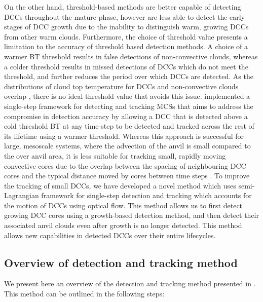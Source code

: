 On the other hand, threshold-based methods are better capable of detecting DCCs throughout the mature phase, however are less able to detect the early stages of DCC growth due to the inability to distinguish warm, growing DCCs from other warm clouds.
Furthermore, the choice of threshold value presents a limitation to the accuracy of threshold based detection methods.
A choice of a warmer BT threshold results in false detections of non-convective clouds, whereas a colder threshold results in missed detections of DCCs which do not meet the threshold, and further reduces the period over which DCCs are detected.
As the distributions of cloud top temperature for DCCs and non-convective clouds overlap \citep{so_classification_2018}, there is no ideal threshold value that avoids this issue.
\citet{fiolleau_algorithm_2013} implemented a single-step framework for detecting and tracking MCSs that aims to address the compromise in detection accuracy by allowing a DCC that is detected above a cold threshold BT at any time-step to be detected and tracked across the rest of its lifetime using a warmer threshold.
Whereas this approach is successful for large, mesoscale systems, where the advection of the anvil is small compared to the over anvil area, it is less suitable for tracking small, rapidly moving convective cores due to the overlap between the spacing of neighbouring DCC cores and the typical distance moved by cores between time steps \citep{heikenfeld_tobac_2019}.
To improve the tracking of small DCCs, we have developed a novel method which uses semi-Lagrangian framework for single-step detection and tracking which accounts for the motion of DCCs using optical flow.
This method allows us to first detect growing DCC cores using a growth-based detection method, and then detect their associated anvil clouds even after growth is no longer detected.
This method allows new capabilities in detected DCCs over their entire lifecycles.

\subsection{Overview of detection and tracking method}

We present here an overview of the detection and tracking method presented in \citet{jones_semi-lagrangian_2022}.
This method can be outlined in the following steps:

